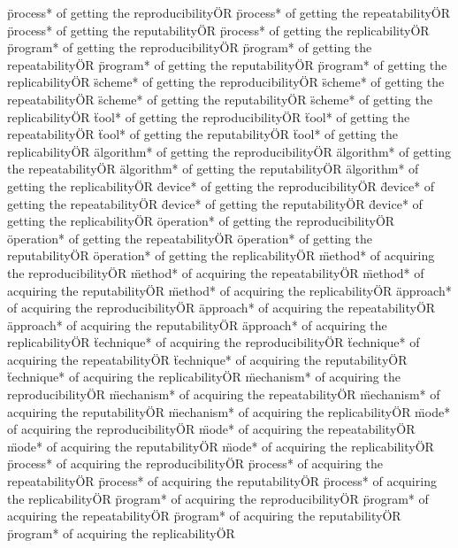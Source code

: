 \documentclass[
10pt, %
a4paper, %
oneside, %
headinclude,footinclude, %
BCOR5mm, %
]{scrartcl}
\begin{document}
\"process* of getting the reproducibility\" OR \"process* of getting the repeatability\" OR \"process* of getting the reputability\" OR \"process* of getting the replicability\" OR 
\"program* of getting the reproducibility\" OR \"program* of getting the repeatability\" OR \"program* of getting the reputability\" OR \"program* of getting the replicability\" OR 
\"scheme* of getting the reproducibility\" OR \"scheme* of getting the repeatability\" OR \"scheme* of getting the reputability\" OR \"scheme* of getting the replicability\" OR 
\"tool* of getting the reproducibility\" OR \"tool* of getting the repeatability\" OR \"tool* of getting the reputability\" OR \"tool* of getting the replicability\" OR 
\"algorithm* of getting the reproducibility\" OR \"algorithm* of getting the repeatability\" OR \"algorithm* of getting the reputability\" OR \"algorithm* of getting the replicability\" OR 
\"device* of getting the reproducibility\" OR \"device* of getting the repeatability\" OR \"device* of getting the reputability\" OR \"device* of getting the replicability\" OR 
\"operation* of getting the reproducibility\" OR \"operation* of getting the repeatability\" OR \"operation* of getting the reputability\" OR \"operation* of getting the replicability\" OR 
\"method* of acquiring the reproducibility\" OR \"method* of acquiring the repeatability\" OR \"method* of acquiring the reputability\" OR \"method* of acquiring the replicability\" OR 
\"approach* of acquiring the reproducibility\" OR \"approach* of acquiring the repeatability\" OR \"approach* of acquiring the reputability\" OR \"approach* of acquiring the replicability\" OR 
\"technique* of acquiring the reproducibility\" OR \"technique* of acquiring the repeatability\" OR \"technique* of acquiring the reputability\" OR \"technique* of acquiring the replicability\" OR 
\"mechanism* of acquiring the reproducibility\" OR \"mechanism* of acquiring the repeatability\" OR \"mechanism* of acquiring the reputability\" OR \"mechanism* of acquiring the replicability\" OR 
\"mode* of acquiring the reproducibility\" OR \"mode* of acquiring the repeatability\" OR \"mode* of acquiring the reputability\" OR \"mode* of acquiring the replicability\" OR 
\"process* of acquiring the reproducibility\" OR \"process* of acquiring the repeatability\" OR \"process* of acquiring the reputability\" OR \"process* of acquiring the replicability\" OR 
\"program* of acquiring the reproducibility\" OR \"program* of acquiring the repeatability\" OR \"program* of acquiring the reputability\" OR \"program* of acquiring the replicability\" OR 
\end{document}
